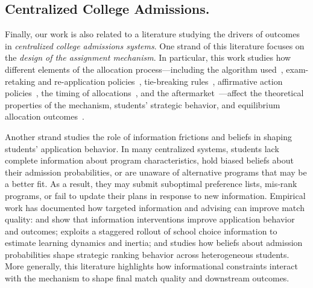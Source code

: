 \documentclass[11pt]{article}
\begin{document}
\subsection{Centralized College Admissions.}
Finally, our work is also related to a literature studying the drivers of outcomes in \emph{centralized college admissions systems}. 
One strand of this literature focuses on the \emph{design of the assignment mechanism}. In particular, this work studies how different elements of the allocation process---including the algorithm used~\citep{Calsamiglia2020}, exam-retaking and re-application policies~\citep{larroucau2025, rios2026}, tie-breaking rules~\citep{abdulkadiroglu2009, Arnosti2015, Ashlagi2019}, affirmative action policies~\citep{rios2021improving,Baswana2019,otero23}, the timing of allocations~\citep{Luflade2017, GongLiang2022}, and the aftermarket~\citep{Kapor2024}---affect the theoretical properties of the mechanism, students' strategic behavior, and equilibrium allocation outcomes~\citep{chenkoesten2013,fu2014,neilson2021}. 

Another strand studies the role of information frictions and beliefs in shaping students’ application behavior. In many centralized systems, students lack complete information about program characteristics, hold biased beliefs about their admission probabilities, or are unaware of alternative programs that may be a better fit. As a result, they may submit suboptimal preference lists, mis‑rank programs, or fail to update their plans in response to new information. Empirical work has documented how targeted information and advising can improve match quality: \citet{hastings2008} and \citet{agarwal2018} show that information interventions improve application behavior and outcomes; \citet{Narita2019} exploits a staggered rollout of school choice information to estimate learning dynamics and inertia; and \citet{larroucau2024} studies how beliefs about admission probabilities shape strategic ranking behavior across heterogeneous students. More generally, this literature highlights how informational constraints interact with the mechanism to shape final match quality and downstream outcomes.
\end{document}
